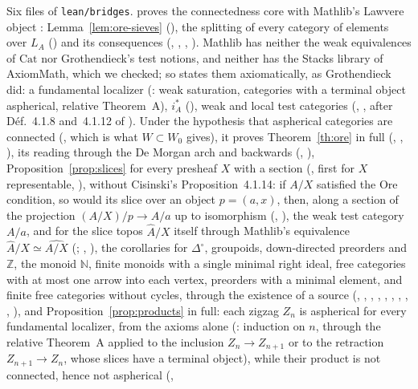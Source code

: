 \leanentry{} Six files of \texttt{lean/bridges}.  proves the connectedness core with Mathlib's Lawvere object : Lemma~\ref{lem:ore-sieves} (), the splitting of every category of elements over $L_A$ () and its consequences (, , , ). Mathlib has neither the weak equivalences of $\mathrm{Cat}$ nor Grothendieck's test notions, and neither has the Stacks library of AxiomMath, which we checked; so  states them axiomatically, as Grothendieck did: a fundamental localizer (: weak saturation, categories with a terminal object aspherical, relative Theorem~A), $i_A^*$ (), weak and local test categories (, , after Déf.~4.1.8 and~4.1.12 of \cite{cisinski-308}). Under the hypothesis that aspherical categories are connected (, which is what $W\subset W_0$ gives), it proves Theorem~\ref{th:ore} in full (, , ), its reading through the De Morgan arch and backwards (, ), Proposition~\ref{prop:slices} for every presheaf $X$ with a section (, first for $X$ representable, ), without Cisinski's Proposition~4.1.14: if $A/X$ satisfied the Ore condition, so would its slice over an object $p=(a,x)$, then, along a section of the projection $(A/X)/p\to A/a$ up to isomorphism (, ), the weak test category $A/a$, and for the slice topos $\widehat A/X$ itself through Mathlib's equivalence $\widehat A/X\simeq\widehat{A/X}$ (; , ), the corollaries for $\Delta^{\circ}$, groupoids, down-directed preorders and $\mathbb Z$, the monoid $\mathbb N$, finite monoids with a single minimal right ideal, free categories with at most one arrow into each vertex, preorders with a minimal element, and finite free categories without cycles, through the existence of a source (, , , , , , , , , ), and Proposition~\ref{prop:products} in full: each zigzag $Z_n$ is aspherical for every fundamental localizer, from the axioms alone (: induction on $n$, through the relative Theorem~A applied to the inclusion $Z_n\to Z_{n+1}$ or to the retraction $Z_{n+1}\to Z_n$, whose slices have a terminal object), while their product is not connected, hence not aspherical (, 